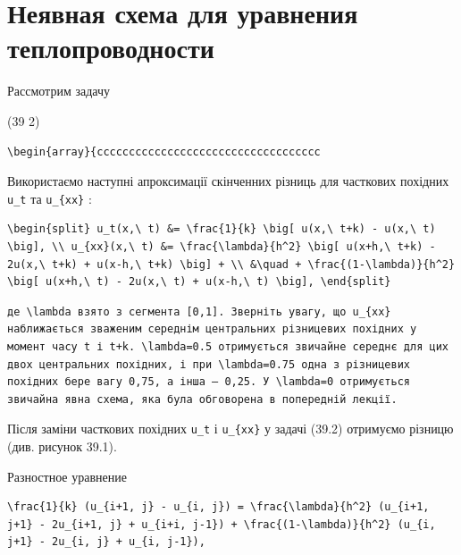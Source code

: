 \documentclass[
  ukrainian,
]{article}
\begin{document}
\section{Неявная схема для уравнения
теплопроводности}\label{ux43dux435ux44fux432ux43dux430ux44f-ux441ux445ux435ux43cux430-ux434ux43bux44f-ux443ux440ux430ux432ux43dux435ux43dux438ux44f-ux442ux435ux43fux43bux43eux43fux440ux43eux432ux43eux434ux43dux43eux441ux442ux438}

Рассмотрим задачу

(39 2)

\begin{verbatim}
\begin{array}{ccccccccccccccccccccccccccccccccccc
\end{verbatim}

Використаємо наступні апроксимації скінченних різниць для часткових
похідних \texttt{u\_t} та \texttt{u\_\{xx\}} :

\begin{verbatim}
\begin{split} u_t(x,\ t) &= \frac{1}{k} \big[ u(x,\ t+k) - u(x,\ t) \big], \\ u_{xx}(x,\ t) &= \frac{\lambda}{h^2} \big[ u(x+h,\ t+k) - 2u(x,\ t+k) + u(x-h,\ t+k) \big] + \\ &\quad + \frac{(1-\lambda)}{h^2} \big[ u(x+h,\ t) - 2u(x,\ t) + u(x-h,\ t) \big], \end{split}
\end{verbatim}

\begin{verbatim}
де \lambda взято з сегмента [0,1]. Зверніть увагу, що u_{xx} наближається зваженим середнім центральних різницевих похідних у момент часу t і t+k. \lambda=0.5 отримується звичайне середнє для цих двох центральних похідних, і при \lambda=0.75 одна з різницевих похідних бере вагу 0,75, а інша — 0,25. У \lambda=0 отримується звичайна явна схема, яка була обговорена в попередній лекції.
\end{verbatim}

Після заміни часткових похідних \texttt{u\_t} і \texttt{u\_\{xx\}} у
задачі (39.2) отримуємо різницю (див. рисунок 39.1).

Разностное уравнение

\begin{verbatim}
\frac{1}{k} (u_{i+1, j} - u_{i, j}) = \frac{\lambda}{h^2} (u_{i+1, j+1} - 2u_{i+1, j} + u_{i+i, j-1}) + \frac{(1-\lambda)}{h^2} (u_{i, j+1} - 2u_{i, j} + u_{i, j-1}),
\end{verbatim}
\end{document}
